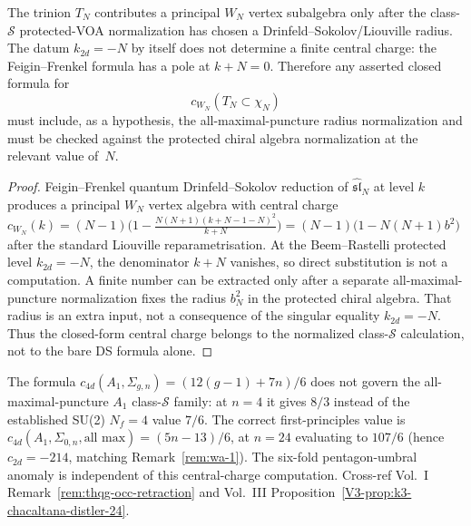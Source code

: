 \begin{proposition}
\label{prop:wa-WN-central-charge}
The trinion $T_N$ contributes a principal $W_N$ vertex subalgebra only
after the class-$\mathcal S$ protected-VOA normalization has chosen a
Drinfeld--Sokolov/Liouville radius.  The datum $k_{2d}=-N$ by itself
does not determine a finite central charge: the Feigin--Frenkel
formula has a pole at $k+N=0$.  Therefore any asserted closed formula
for
\[
 c_{W_N}(T_N\subset \chi_N)
\]
must include, as a hypothesis, the all-maximal-puncture radius
normalization and must be checked against the protected chiral algebra
normalization at the relevant value of~$N$.
\end{proposition}

\begin{proof}
Feigin--Frenkel quantum Drinfeld--Sokolov reduction of
$\widehat{\mathfrak{sl}}_N$ at level $k$ produces a principal $W_N$
vertex algebra with central charge
$c_{W_N}(k) = (N - 1)\bigl(1 - \frac{N(N+1)(k + N - 1 - N)^2}{k + N}\bigr)
 = (N - 1)\bigl(1 - N(N+1)b^2\bigr)$
after the standard Liouville reparametrisation.  At the Beem--Rastelli
protected level $k_{2d}=-N$, the denominator $k+N$ vanishes, so direct
substitution is not a computation.  A finite number can be extracted
only after a separate all-maximal-puncture normalization fixes the
radius $b_N^2$ in the protected chiral algebra.  That radius is an
extra input, not a consequence of the singular equality $k_{2d}=-N$.
Thus the closed-form central charge belongs to the normalized
class-$\mathcal S$ calculation, not to the bare DS formula alone.
\end{proof}

\begin{remark}
\label{rem:wa-retraction}
The formula
$c_{4d}(A_1, \Sigma_{g,n}) = (12(g-1) + 7n)/6$
does not govern the all-maximal-puncture $A_1$ class-$\mathcal S$
family: at $n=4$ it gives $8/3$ instead of the
established SU(2) $N_f = 4$ value $7/6$. The correct
first-principles value is
$c_{4d}(A_1, \Sigma_{0,n}, \text{all max}) = (5n - 13)/6$, at
$n = 24$ evaluating to $107/6$ (hence $c_{2d} = -214$, matching
Remark~\ref{rem:wa-1}). The six-fold pentagon-umbral anomaly is
independent of this central-charge computation.
Cross-ref
Vol.~I
Remark~\ref{rem:thqg-occ-retraction} and Vol.~III
Proposition~\ref{V3-prop:k3-chacaltana-distler-24}.
\end{remark}

